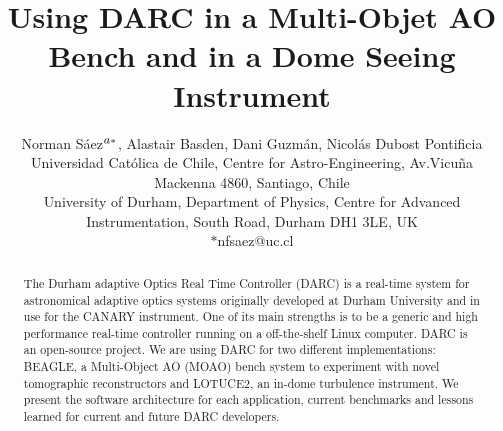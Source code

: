 \documentclass[]{spie}  %
\title{Using DARC in a Multi-Objet AO Bench and in a Dome Seeing Instrument}
\author{Norman S\'aez$\supit{a}^{*}$, Alastair Basden\supit{b}, Dani Guzm\'an\supit{a}, Nicol\'as Dubost\supit{a}
\skiplinehalf
\supit{a}Pontificia Universidad Cat\'olica de Chile, Centre for Astro-Engineering, Av.Vicu\~na Mackenna 4860, Santiago, Chile\\
\supit{b}University of Durham, Department of Physics, Centre for Advanced Instrumentation, South Road, Durham DH1 3LE, UK\\ $*$nfsaez@uc.cl
}
\begin{document}
 
  \maketitle 

\begin{abstract}
The Durham adaptive Optics Real Time Controller (DARC)\cite{basden2010durham} is a real-time system
for astronomical adaptive optics systems originally developed at Durham
University and in use for the CANARY instrument. One of its main strengths is
to be a generic and high performance real-time controller running on a
off-the-shelf Linux computer. DARC is an open-source project. We are using DARC
for two different implementations: BEAGLE, a Multi-Object AO (MOAO) bench
system to experiment with novel tomographic reconstructors and LOTUCE2, an
in-dome turbulence instrument. We present the software architecture for each
application, current benchmarks and lessons learned for current and future DARC
developers.
\end{abstract}



\end{document}
